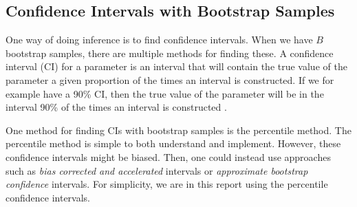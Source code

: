 

\subsection{Confidence Intervals with Bootstrap Samples}
\label{theory_ci_bootstrap}
One way of doing inference is to find confidence intervals. When we have $B$ bootstrap samples, there are multiple methods for finding these.  
A confidence interval (CI) for a parameter is an interval that will contain the true value of the parameter a given proportion of the times an interval is constructed. If we for example have a 90\% CI, then the true value of the parameter will be in the interval 90\% of the times an interval is constructed \citep{bootstrap}.

One method for finding CIs with bootstrap samples is the percentile method. The percentile method is simple to both understand and implement. However, these confidence intervals might be biased. Then, one could instead use approaches such as \textit{bias corrected and accelerated} intervals or \textit{approximate bootstrap confidence} intervals. For simplicity, we are in this report using the percentile confidence intervals. 


